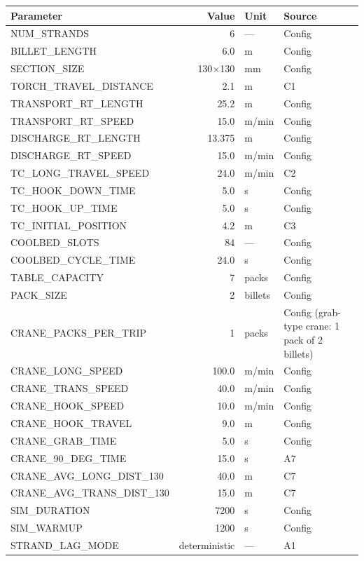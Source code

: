\documentclass[11pt,a4paper]{article}
\begin{document}
\begin{longtable}{@{}lrll@{}}
\toprule
Parameter & Value & Unit & Source \\
\midrule
\endhead
NUM\_STRANDS & 6 & --- & Config \\
BILLET\_LENGTH & 6.0 & m & Config \\
SECTION\_SIZE & 130$\times$130 & mm & Config \\
TORCH\_TRAVEL\_DISTANCE & 2.1 & m & C1 \\
TRANSPORT\_RT\_LENGTH & 25.2 & m & Config \\
TRANSPORT\_RT\_SPEED & 15.0 & m/min & Config \\
DISCHARGE\_RT\_LENGTH & 13.375 & m & Config \\
DISCHARGE\_RT\_SPEED & 15.0 & m/min & Config \\
TC\_LONG\_TRAVEL\_SPEED & 24.0 & m/min & C2 \\
TC\_HOOK\_DOWN\_TIME & 5.0 & s & Config \\
TC\_HOOK\_UP\_TIME & 5.0 & s & Config \\
TC\_INITIAL\_POSITION & 4.2 & m & C3 \\
COOLBED\_SLOTS & 84 & --- & Config \\
COOLBED\_CYCLE\_TIME & 24.0 & s & Config \\
TABLE\_CAPACITY & 7 & packs & Config \\
PACK\_SIZE & 2 & billets & Config \\
CRANE\_PACKS\_PER\_TRIP & 1 & packs & Config (grab-type crane: 1 pack of 2 billets) \\
CRANE\_LONG\_SPEED & 100.0 & m/min & Config \\
CRANE\_TRANS\_SPEED & 40.0 & m/min & Config \\
CRANE\_HOOK\_SPEED & 10.0 & m/min & Config \\
CRANE\_HOOK\_TRAVEL & 9.0 & m & Config \\
CRANE\_GRAB\_TIME & 5.0 & s & Config \\
CRANE\_90\_DEG\_TIME & 15.0 & s & A7 \\
CRANE\_AVG\_LONG\_DIST\_130 & 40.0 & m & C7 \\
CRANE\_AVG\_TRANS\_DIST\_130 & 15.0 & m & C7 \\
SIM\_DURATION & 7200 & s & Config \\
SIM\_WARMUP & 1200 & s & Config \\
STRAND\_LAG\_MODE & deterministic & --- & A1 \\
\bottomrule
\end{longtable}
\end{document}
